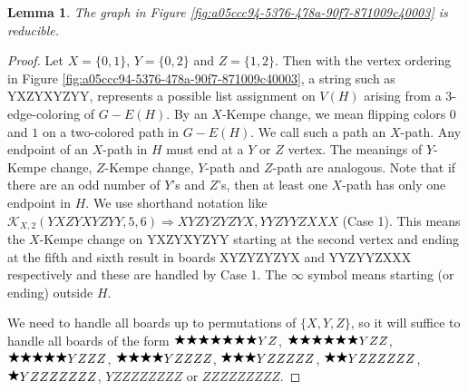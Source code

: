 \documentclass[12pt]{article}
\theoremstyle{plain}
\newtheorem{lem}[thm]{Lemma}
\theoremstyle{definition}
\theoremstyle{remark}
\newcommand{\fancy}[1]{\mathcal{#1}}
\def\K{\fancy{K}}
\newcommand{\wild}{\raisebox{0.75\depth}{$\bigstar$}}
\begin{document}
\begin{lem}
	The graph in Figure \ref{fig:a05ccc94-5376-478a-90f7-871009c40003} is reducible.
\end{lem}
\begin{proof}Let $X = \{0,1\}$, $Y = \{0,2\}$ and $Z = \{1,2\}$. Then with the vertex ordering in Figure \ref{fig:a05ccc94-5376-478a-90f7-871009c40003}, a string such as YXZYXYZYY, 
	represents a possible list assignment on $V(H)$ arising from a $3$-edge-coloring of $G-E(H)$.
	By an $X$-Kempe change, we mean flipping colors $0$ and $1$ on a two-colored path in $G-E(H)$.  We call such a path an $X$-path. 
	Any endpoint of an $X$-path in $H$ must end at a $Y$ or $Z$ vertex.  The meanings of $Y$-Kempe change, $Z$-Kempe change, $Y$-path and $Z$-path are analogous.
	Note that if there are an odd number of $Y$'s and $Z$'s, then at least one $X$-path has only one endpoint in $H$.
	We use shorthand notation like $\K_{X, 2}(YXZYXYZYY,5,6) \Rightarrow XYZYZYZYX,YYZYYZXXX$ (Case 1).
	This means the $X$-Kempe change on YXZYXYZYY starting at the second vertex and ending at the fifth and sixth result in boards XYZYZYZYX and YYZYYZXXX respectively and these are handled by Case 1.
	The $\infty$ symbol means starting (or ending) outside $H$.
	
	We need to handle all boards up to permutations of $\{X,Y,Z\}$, so it will suffice to handle all boards of the form $\wild \wild \wild \wild \wild \wild \wild YZ$, $\wild \wild \wild \wild \wild \wild YZZ$, $\wild \wild \wild \wild \wild YZZZ$, $\wild \wild \wild \wild YZZZZ$, $\wild \wild \wild YZZZZZ$, $\wild \wild YZZZZZZ$, $\wild YZZZZZZZ$, $YZZZZZZZZ$ or $ZZZZZZZZZ$.
	

\end{proof}
\end{document}

